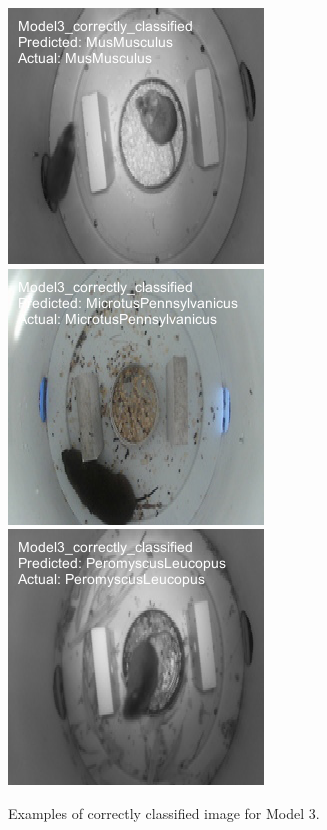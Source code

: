 \documentclass[a4paper,12pt]{article}
\begin{document}
\begin{figure}[H]
    \centering
    \includegraphics[width=0.3\linewidth]{results/Model3_correctly_classified_image_503.png}
    \includegraphics[width=0.3\linewidth]{results/Model3_correctly_classified_image_4.png}
    \includegraphics[width=0.3\linewidth]{results/Model3_correctly_classified_image_3.png}
    \caption{Examples of correctly classified image for Model 3.}
\end{figure}
\end{document}
